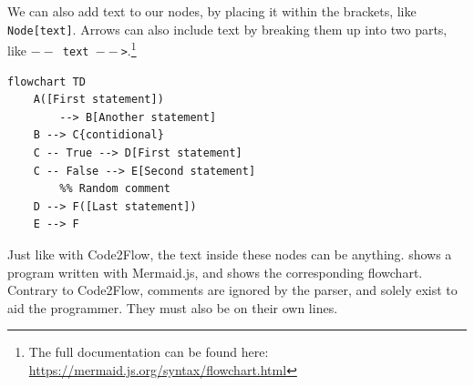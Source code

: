 We can also add text to our nodes, by placing it within the brackets, like \texttt{Node[text]}. Arrows can also include text by breaking them up into two parts, like \texttt{$--$ text $--$>}.\footnote{The full documentation can be found here: \url{https://mermaid.js.org/syntax/flowchart.html}} \\

\begin{lstlisting}[caption={A mermaid.js program.}, captionpos=b, label={A mermaid.js program.}]
flowchart TD
    A([First statement])
        --> B[Another statement]
    B --> C{contidional}
    C -- True --> D[First statement]
    C -- False --> E[Second statement]
        %% Random comment
    D --> F([Last statement])
    E --> F
\end{lstlisting}

Just like with Code2Flow, the text inside these nodes can be anything.  shows a program written with Mermaid.js, and  shows the corresponding flowchart. Contrary to Code2Flow, comments are ignored by the parser, and solely exist to aid the programmer. They must also be on their own lines. \\

